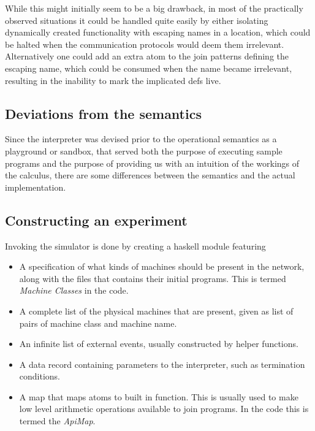 While this might initially seem to be a big drawback, in most of the practically
observed situations it could be handled quite easily by either isolating
dynamically created functionality with escaping names in a location, which could
be halted when the communication protocols would deem them irrelevant.
Alternatively one could add an extra atom to the join patterns defining the
escaping name, which could be consumed when the name became irrelevant,
resulting in the inability to mark the implicated defs live.

\subsection*{Deviations from the semantics}
Since the interpreter was devised prior to the operational semantics as a
playground or sandbox, that served both the purpose of executing sample programs
and the purpose of providing us with an intuition of the workings of the
calculus, there are some differences between the semantics and the actual
implementation.

\subsection*{Constructing an experiment}
Invoking the simulator is done by creating a haskell module featuring
\begin{itemize}

\item A specification of what kinds of machines should be present in the
network, along with the files that contains their initial programs. This is
termed \emph{Machine Classes} in the code.

\item A complete list of the physical machines that are present, given as list
of pairs of machine class and machine name.

\item An infinite list of external events, usually constructed by helper
functions.

\item A data record containing parameters to the interpreter, such as
termination conditions.

\item A map that maps atoms to built in function. This is usually used to make
low level arithmetic operations available to join programs. In the code this is
termed the \emph{ApiMap}.

\end{itemize}
